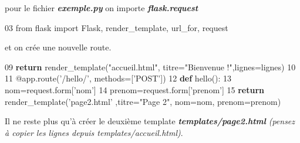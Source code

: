 \documentclass{article}
\newenvironment{Shaded}{}{}
\newcommand{\KeywordTok}[1]{\textcolor[rgb]{0.00,0.44,0.13}{\textbf{{#1}}}}
\newcommand{\DecValTok}[1]{\textcolor[rgb]{0.25,0.63,0.44}{{#1}}}
\newcommand{\CharTok}[1]{\textcolor[rgb]{0.25,0.44,0.63}{{#1}}}
\newcommand{\StringTok}[1]{\textcolor[rgb]{0.25,0.44,0.63}{{#1}}}
\newcommand{\NormalTok}[1]{{#1}}
\begin{document}
pour le fichier \textbf{\emph{exemple.py}} on importe
\textbf{\emph{flask.request}}

\begin{Shaded}
\begin{Highlighting}[]
\DecValTok{03} \CharTok{from} \NormalTok{flask }\CharTok{import} \NormalTok{Flask, render_template, url_for, request}
\end{Highlighting}
\end{Shaded}

et on crée une nouvelle route.

\begin{Shaded}
\begin{Highlighting}[]
\DecValTok{09}      \KeywordTok{return} \NormalTok{render_template(}\StringTok{"accueil.html"}\NormalTok{, titre=}\StringTok{"Bienvenue !"}\NormalTok{,lignes=lignes)}
\DecValTok{10}
\DecValTok{11} \NormalTok{@app.route(}\StringTok{'/hello/'}\NormalTok{, methods=[}\StringTok{'POST'}\NormalTok{])}
\DecValTok{12} \KeywordTok{def} \NormalTok{hello():}
\DecValTok{13}     \NormalTok{nom=request.form[}\StringTok{'nom'}\NormalTok{]}
\DecValTok{14}     \NormalTok{prenom=request.form[}\StringTok{'prenom'}\NormalTok{]}
\DecValTok{15}     \KeywordTok{return} \NormalTok{render_template(}\StringTok{'page2.html'} \NormalTok{,titre=}\StringTok{"Page 2"}\NormalTok{, nom=nom, prenom=prenom)}
\end{Highlighting}
\end{Shaded}

Il ne reste plus qu'à créer le deuxième template
\textbf{\emph{templates/page2.html}} \emph{(pensez à copier les lignes
depuis templates/accueil.html)}.
\end{document}
